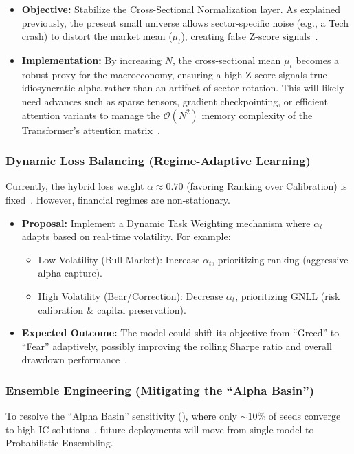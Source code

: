\documentclass[twoside,final]{hcmut-report}
\newcommand{\result}[1]{\fcolorbox{red}{white}{#1}}
\begin{document}
\begin{itemize}
  \item \textbf{Objective:} Stabilize the Cross-Sectional Normalization layer. As explained previously, the present small universe allows sector-specific noise (e.g., a Tech crash) to distort the market mean ($\mu_t$), creating false Z-score signals~\cite{msmixer_gcn2025, lstm_skewt2025}.
  \item \textbf{Implementation:} By increasing $N$, the cross-sectional mean $\mu_t$ becomes a robust proxy for the macroeconomy, ensuring a high Z-score signals true idiosyncratic alpha rather than an artifact of sector rotation. This will likely need advances such as sparse tensors, gradient checkpointing, or efficient attention variants to manage the $\mathcal{O}(N^2)$ memory complexity of the Transformer's attention matrix~\cite{stockformer2023}.
\end{itemize}

\subsubsection{Dynamic Loss Balancing (Regime-Adaptive Learning)}
Currently, the hybrid loss weight $\alpha\approx0.70$ (favoring Ranking over Calibration) is fixed~\cite{portfoliomaster2025}. However, financial regimes are non-stationary.

\begin{itemize}
  \item \textbf{Proposal:} Implement a Dynamic Task Weighting mechanism where $\alpha_t$ adapts based on real-time volatility. For example:
        \begin{itemize}
          \item Low Volatility (Bull Market): Increase $\alpha_t$, prioritizing ranking (aggressive alpha capture).
          \item High Volatility (Bear/Correction): Decrease $\alpha_t$, prioritizing GNLL (risk calibration \& capital preservation).
        \end{itemize}
  \item \textbf{Expected Outcome:} The model could shift its objective from ``Greed'' to ``Fear'' adaptively, possibly improving the rolling Sharpe ratio and overall drawdown performance~\cite{deep_mom2019}.
\end{itemize}

\subsubsection{Ensemble Engineering (Mitigating the ``Alpha Basin'')}
To resolve the ``Alpha Basin'' sensitivity (\result{Section~\ref{alpha_basin}}), where only $\sim$10\% of seeds converge to high-IC solutions~\cite{frankle2019lottery, frankle2020linear}, future deployments will move from single-model to Probabilistic Ensembling.
\end{document}
